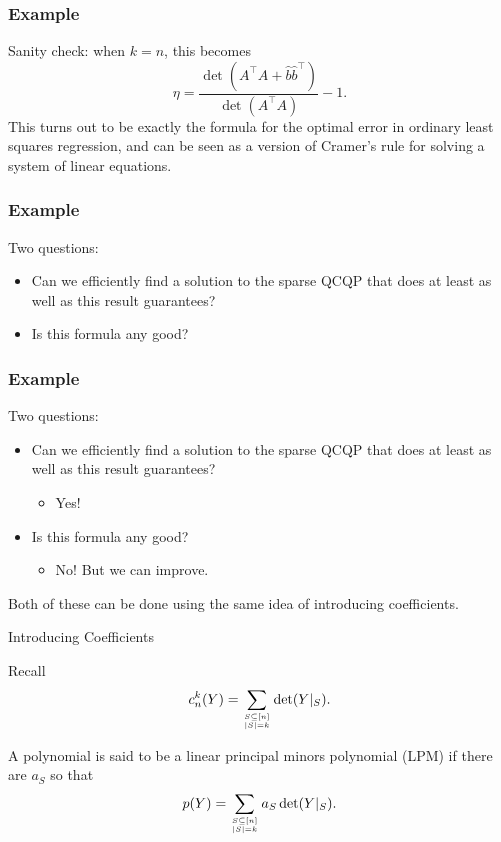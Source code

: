 \documentclass{beamer}
\renewcommand\top[2]{\genfrac{}{}{0pt}{}{#1}{#2}}
\begin{document}
\begin{frame}
    \frametitle{Example}
    Sanity check: when $k = n$, this becomes
    \[
        \eta = \frac{\det(A^{\intercal}A+\hat{b}\hat{b}^{\intercal})}{\det(A^{\intercal}A)} - 1.
    \]
    \pause
    This turns out to be exactly the formula for the optimal error in ordinary least squares regression, and can be seen as a version of Cramer's rule for solving a system of linear equations.
\end{frame}
\begin{frame}
    \frametitle{Example}
    Two questions:
    \begin{itemize}
        \item Can we efficiently find a solution to the sparse QCQP that does at least as well as this result guarantees?
        \pause
        \item Is this formula any good?
    \end{itemize}
\end{frame}
\begin{frame}
    \frametitle{Example}
    Two questions:
    \begin{itemize}
        \item Can we efficiently find a solution to the sparse QCQP that does at least as well as this result guarantees?
            \begin{itemize}
                \item Yes!
            \end{itemize}

        \item Is this formula any good?
            \begin{itemize}
                \item No! But we can improve.
            \end{itemize}
    \end{itemize}
    Both of these can be done using the same idea of introducing coefficients.
\end{frame}
\begin{frame}
    \centering
    \huge
    {\color{gray}Introducing Coefficients}
\end{frame}
\begin{frame}
    Recall
    \[
        c_n^k(Y) = \sum_{\top{S \subseteq [n]}{|S| = k}}  \det(Y|_S).
    \]
\end{frame}
\begin{frame}
    A polynomial is said to be a linear principal minors polynomial (LPM) if there are $a_S$ so that
    \[
        p(Y) = \sum_{\top{S \subseteq [n]}{|S| = k}} a_S \det(Y|_S).
    \]
\end{frame}
\end{document}
